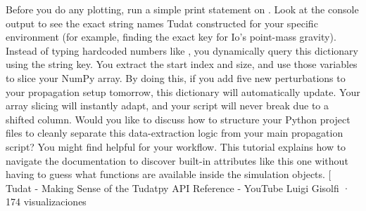 \markdownRendererUlEnd \markdownRendererInterblockSeparator
{}
\markdownRendererSectionEnd \markdownRendererSectionBegin
{}\markdownRendererInterblockSeparator
{}\markdownRendererOlBegin
{} Before you do any plotting, run a simple print statement on .\markdownRendererOlItemEnd 
{} Look at the console output to see the exact string names Tudat constructed for your specific environment (for example, finding the exact key for Io's point-mass gravity).\markdownRendererOlItemEnd 
{} Instead of typing hardcoded numbers like \markdownRendererCodeSpan{[9:12]}, you dynamically query this dictionary using the string key. You extract the start index and size, and use those variables to slice your NumPy array.\markdownRendererOlItemEnd 
\markdownRendererOlEnd \markdownRendererInterblockSeparator
{}By doing this, if you add five new perturbations to your propagation setup tomorrow, this dictionary will automatically update. Your array slicing will instantly adapt, and your script will never break due to a shifted column.\markdownRendererInterblockSeparator
{}\markdownRendererThematicBreak{}\markdownRendererInterblockSeparator
{}Would you like to discuss how to structure your Python project files to cleanly separate this data-extraction logic from your main propagation script?\markdownRendererInterblockSeparator
{}You might find  helpful for your workflow. This tutorial explains how to navigate the documentation to discover built-in attributes like this one without having to guess what functions are available inside the simulation objects.\markdownRendererInterblockSeparator
{}[\markdownRendererInterblockSeparator
{}\markdownRendererInterblockSeparator
{}Tudat - Making Sense of the Tudatpy API Reference - YouTube\markdownRendererInterblockSeparator
{}Luigi Gisolfi · 174 visualizaciones\markdownRendererInterblockSeparator
